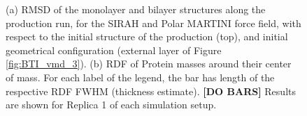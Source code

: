 \begin{figure}
\begin{minipage}[c]{0.5\textwidth}
    \end{minipage}
    \begin{minipage}[c]{0.48\textwidth}
    \end{minipage}
    \caption[Comparison of structural properties between monolayer and bilayer structures]{(a) RMSD of the monolayer and bilayer structures along the production run, for the SIRAH and Polar MARTINI force field, with respect to the initial structure of the production (top), and initial geometrical configuration (external layer of Figure \ref{fig:BTI_vmd_3}). (b) RDF of Protein masses around their center of mass. For each label of the legend, the bar has length of the respective RDF FWHM (thickness estimate). \textbf{[DO BARS]} Results are shown for Replica 1 of each simulation setup.}
\label{fig:mono_bi}
\end{figure}


